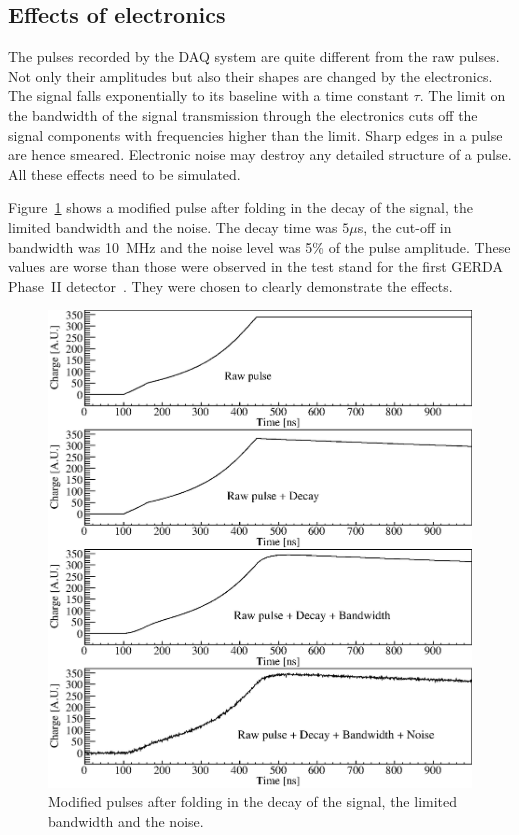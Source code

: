 \documentclass[epj]{svjour}
\begin{document}
\subsection{Effects of electronics} 
\label{s:dbn}
The pulses recorded by the DAQ system are quite different from the raw
pulses. Not only their amplitudes but also their shapes are changed by
the electronics. The signal falls exponentially to its baseline with a
time constant $\tau$. The limit on the bandwidth of the signal
transmission through the electronics cuts off the signal components
with frequencies higher than the limit. Sharp edges in a pulse are
hence smeared. Electronic noise may destroy any detailed structure of
a pulse. All these effects need to be simulated.
 
Figure~\ref{f:elec} shows a modified pulse after folding in the decay
of the signal, the limited bandwidth and the noise. The decay time was
$5 \mu$s, the cut-off in bandwidth was 10~MHz and the noise level was
5\% of the pulse amplitude. These values are worse than those were
observed in the test stand for the first GERDA Phase~II
detector~\cite{si}. They were chosen to clearly demonstrate the
effects.
\begin{figure}[htpb]
\centering
\includegraphics[width=\linewidth]{PSDBN} 
\caption{Modified pulses after folding in the decay of the signal, the
limited bandwidth and the noise.}
\label{f:elec} 
\end{figure}
\end{document}

